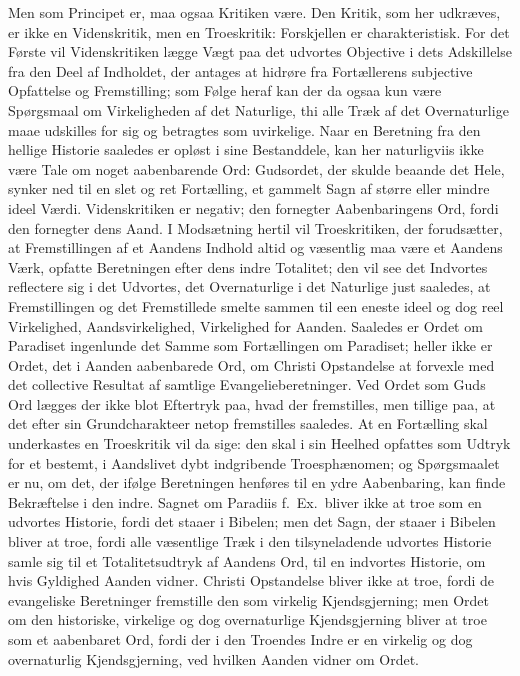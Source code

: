 \documentclass[12pt]{book}
\begin{document}
Men som Principet er, maa ogsaa Kritiken være. Den Kritik, som her
udkræves, er ikke en Videnskritik, men en Troeskritik: Forskjellen
er charakteristisk. For det Første vil Videnskritiken lægge Vægt
paa det udvortes Objective i dets Adskillelse fra den Deel af
Indholdet, der antages at hidrøre fra Fortællerens subjective
Opfattelse og Fremstilling; som Følge heraf kan der da ogsaa kun
være Spørgsmaal om Virkeligheden af det Naturlige, thi alle Træk af
det Overnaturlige maae udskilles for sig og betragtes som
uvirkelige. Naar en Beretning fra den hellige Historie saaledes er
opløst i sine Bestanddele, kan her naturligviis ikke være Tale om
noget aabenbarende Ord: Gudsordet, der skulde beaande det Hele,
synker ned til en slet og ret Fortælling, et gammelt Sagn af større
eller mindre ideel Værdi. Videnskritiken er negativ; den fornegter
Aabenbaringens Ord, fordi den fornegter dens Aand. I Modsætning
hertil vil Troeskritiken, der forudsætter, at Fremstillingen af et
Aandens Indhold altid og væsentlig maa være et Aandens Værk,
opfatte Beretningen efter dens indre Totalitet; den vil see det
Indvortes reflectere sig i det Udvortes, det Overnaturlige i det
Naturlige just saaledes, at Fremstillingen og det Fremstillede
smelte sammen til een eneste ideel og dog reel Virkelighed,
Aandsvirkelighed, Virkelighed for Aanden. Saaledes er Ordet om
Paradiset ingenlunde det Samme som Fortællingen om Paradiset;
heller ikke er Ordet, det i Aanden aabenbarede Ord, om Christi
Opstandelse at forvexle med det collective Resultat af samtlige
Evangelieberetninger. Ved Ordet som Guds Ord lægges der ikke blot
Eftertryk paa, hvad der
fremstilles, men tillige paa, at det efter sin Grundcharakteer netop
fremstilles saaledes. At en Fortælling skal underkastes en
Troeskritik vil da sige: den skal i sin Heelhed opfattes som Udtryk
for et bestemt, i Aandslivet dybt indgribende Troesphænomen; og
Spørgsmaalet er nu, om det, der ifølge Beretningen henføres til en
ydre Aabenbaring, kan finde Bekræftelse i den indre. Sagnet om
Paradiis f.\ Ex.\ bliver ikke at troe som en udvortes Historie,
fordi det staaer i Bibelen; men det Sagn, der staaer i Bibelen
bliver at troe, fordi alle væsentlige Træk i den tilsyneladende
udvortes Historie samle sig til et Totalitetsudtryk af Aandens Ord,
til en indvortes Historie, om hvis Gyldighed Aanden vidner. Christi
Opstandelse bliver ikke at troe, fordi de evangeliske Beretninger
fremstille den som virkelig Kjendsgjerning; men Ordet om den
historiske, virkelige og dog overnaturlige Kjendsgjerning bliver at
troe som et aabenbaret Ord, fordi der i den Troendes Indre er en
virkelig og dog overnaturlig Kjendsgjerning, ved hvilken Aanden
vidner om Ordet.
\end{document}
